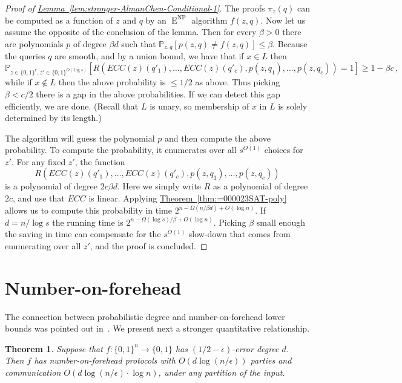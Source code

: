 \documentclass[11pt]{article}
\newcommand{\expref}[2]{\texorpdfstring{\hyperref[#2]{#1~\ref{#2}}}{#1~\ref{#2}}}
\newtheorem{thm}[theorem]{Theorem}
\DeclareMathOperator{\NP}{\mathrm{NP}}  %
\DeclareMathOperator{\EEE}{\mathrm{E}}  %
\newcommand{\zo}{\{0, 1\}}
\renewcommand{\P}{\mathbb{P}}
\newcommand{\e}{\epsilon}
\begin{document}
\begin{proof}[Proof of \expref{Lemma}{lem:stronger-AlmanChen-Conditional-1}]
The proofs $\pi_{z}(q)$ can be computed as a function of $z$ and
$q$ by an $\EEE^{\NP}$ algorithm $f(z,q)$. Now let us assume the opposite
of the conclusion of the lemma. Then for every $\beta>0$ there are
polynomials $p$ of degree $\beta d$ such that $\P_{z,q}[p(z,q)\ne f(z,q)]\le\beta$.
Because the queries $q$ are smooth, and by a union bound, we have
that if $x\in L$ then
\[
\P_{z\in\zo^{r},z'\in\zo^{O(\log s)}}[R(ECC(z)(q'_{1}),\ldots,ECC(z)(q'_{c}),p(z,q_{1}),\ldots,p(z,q_{c}))=1]\ge1-\beta c\,,
\]
while if $x\not\in L$ then the above probability is $\le1/2$ as
above. Thus picking $\beta<c/2$ there is a gap in the above probabilities.
If we can detect this gap efficiently, we are done. (Recall that $L$
is unary, so membership of $x$ in $L$ is solely determined by its
length.)

The algorithm will guess the polynomial $p$ and then compute the
above probability. To compute the probability, it enumerates over
all $s^{O(1)}$ choices for $z'$. For any fixed $z'$, the function
\[
R(ECC(z)(q'_{1}),\ldots,ECC(z)(q'_{c}),p(z,q_{1}),\ldots,p(z,q_{c}))
\]
is a polynomial of degree $2c\beta d$. Here we simply write $R$
as a polynomial of degree $2c$, and use that $ECC$ is linear. Applying
\expref{Theorem}{thm:=000023SAT-poly} allows us to compute this probability
in time $2^{n-\Omega(n/\beta d)+O(\log n)}$. If $d=n/\log s$ the
running time is $2^{n-\Omega(\log s)/\beta+O(\log n)}$. Picking $\beta$
small enough the saving in time can compensate for the $s^{O(1)}$
slow-down that comes from enumerating over all $z'$, and the proof
is concluded.
\end{proof}

\section{Number-on-forehead \label{sec:Number-on-forehead}}

The connection between probabilistic degree and number-on-forehead
lower bounds was pointed out in~\cite{Viola-map}. We present next
a stronger quantitative relationship.
\begin{thm}
\label{thm:NOF-connection}Suppose that $f:\zo^{n}\to\zo$ has $(1/2-\e)$-error
degree $d$. Then $f$ has number-on-forehead protocols with $O(d\log(n/\e))$
parties and communication $O(d\log(n/\e)\cdot\log n)$, under any
partition of the input.
\end{thm}
\end{document}
